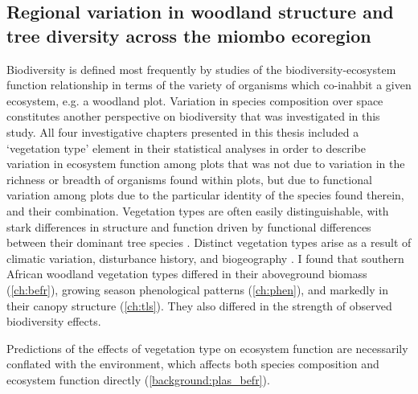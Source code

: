 \begin{refsection}


\subsection{Regional variation in woodland structure and tree diversity across the miombo ecoregion}
\label{discussion:ssec:veg_type}

Biodiversity is defined most frequently by studies of the biodiversity-ecosystem function relationship in terms of the variety of organisms which co-inahbit a given ecosystem, e.g. a woodland plot. Variation in species composition over space constitutes another perspective on biodiversity that was investigated in this study. All four investigative chapters presented in this thesis included a `vegetation type' element in their statistical analyses in order to describe variation in ecosystem function among plots that was not due to variation in the richness or breadth of organisms found within plots, but due to functional variation among plots due to the particular identity of the species found therein, and their combination. Vegetation types are often easily distinguishable, with stark differences in structure and function driven by functional differences between their dominant tree species \citep{Solbrig1996}. Distinct vegetation types arise as a result of climatic variation, disturbance history, and biogeography \citep{}. I found that southern African woodland vegetation types differed in their aboveground biomass (\autoref{ch:befr}), growing season phenological patterns (\autoref{ch:phen}), and markedly in their canopy structure (\autoref{ch:tls}). They also differed in the strength of observed biodiversity effects. 

Predictions of the effects of vegetation type on ecosystem function are necessarily conflated with the environment, which affects both species composition and ecosystem function directly (\autoref{background:plas_befr}). 


\end{refsection}

